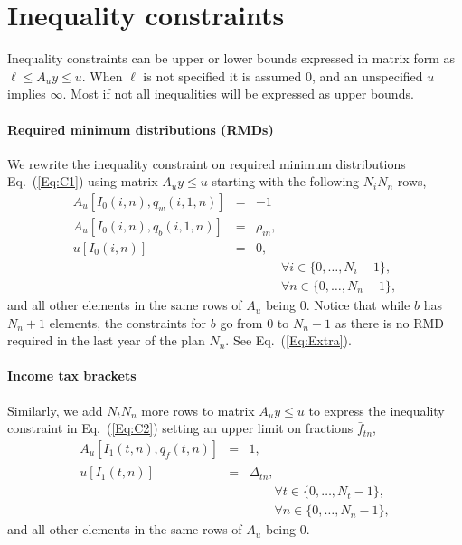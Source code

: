 \documentclass{report}[fleqn,12pt]
\begin{document}
\section{Inequality constraints}
Inequality constraints can be upper or lower bounds expressed in matrix form as
$\ell \le A_{u}y \le u$. When $\ell$ is not specified it is assumed 0, and
an unspecified $u$ implies $\infty$. Most if not all inequalities will be expressed as upper bounds.

\paragraph*{Required minimum distributions (RMDs)}
We rewrite the inequality constraint on required minimum distributions
Eq.~(\ref{Eq:C1}) using matrix $A_{u}y \le u$ starting with the following $N_iN_n$ rows, 
\begin{eqnarray}
	A_u[I_0(i, n), q_w(i, 1, n)] &=& -1 \nonumber \\
	A_u[I_0(i, n), q_b(i, 1, n)] &=& \rho_{in}, \nonumber \\
	u[I_0(i, n)] &=& 0, \\
	&&\qquad\forall i \in \{0,\ldots, N_i - 1\}, \nonumber\\
	&&\qquad\forall n \in \{0,\ldots, N_n - 1\},\nonumber
\end{eqnarray}
and all other elements in the same rows of $A_u$ being $0$.
Notice that while $b$ has $N_n+1$ elements, the constraints
for $b$ go from $0$ to $N_n-1$ as there is no RMD required in the last year of the plan $N_n$.
See Eq.~(\ref{Eq:Extra}).

\paragraph*{Income tax brackets}
Similarly, we add $N_t N_n$ more rows to matrix $A_uy \le u$ to express
the inequality constraint in Eq.~(\ref{Eq:C2})
setting an upper limit on fractions $\bar{f}_{tn}$,
\begin{eqnarray}
	A_u[I_1(t, n), q_{f}(t, n)] &=& 1, \nonumber \\
	u[I_1(t, n)] &=& \bar{\Delta}_{tn},\\
	&&\qquad\forall t \in \{0,\ldots, N_t - 1\}, \nonumber\\
	&&\qquad\forall n \in \{0,\ldots, N_n - 1\},\nonumber
\end{eqnarray}
and all other elements in the same rows of $A_u$ being $0$.
\end{document}
